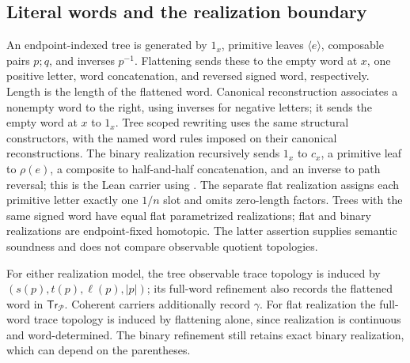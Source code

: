 \documentclass[10pt,reqno]{amsart}
\theoremstyle{definition}
\theoremstyle{plain}
\theoremstyle{remark}
\newcommand{\LeanName}[1]{\path{#1}}
\begin{document}
\subsection{Literal words and the realization boundary}
An endpoint-indexed tree is generated by $1_x$, primitive leaves
$\langle e\rangle$, composable pairs $p;q$, and inverses $p^{-1}$.
Flattening sends these to the empty word at $x$, one positive letter,
word concatenation, and reversed signed word, respectively. Length is
the length of the flattened word. Canonical reconstruction associates
a nonempty word to the right, using inverses for negative letters;
it sends the empty word at $x$ to $1_x$. Tree scoped rewriting uses the
same structural constructors, with the named word rules imposed on
their canonical reconstructions.
The binary realization recursively sends $1_x$ to $c_x$, a primitive
leaf to $\rho(e)$, a composite to half-and-half concatenation, and an
inverse to path reversal; this is the Lean carrier using \LeanName{Path.trans}.
The separate flat realization assigns each primitive letter exactly one
$1/n$ slot and omits zero-length factors. Trees with the same signed word
have equal flat parametrized realizations; flat and binary realizations
are endpoint-fixed homotopic. The latter assertion supplies semantic
soundness and does not compare observable quotient topologies.

For either realization model, the tree observable trace topology is induced
by $(s(p),t(p),\ell(p),|p|)$; its full-word refinement also records the
flattened word in $\mathsf{Tr}_{\mathcal P}$. Coherent carriers additionally
record $\gamma$. For flat realization the full-word trace topology is
induced by flattening alone, since realization is continuous and
word-determined. The binary refinement still retains exact binary
realization, which can depend on the parentheses.
\end{document}

